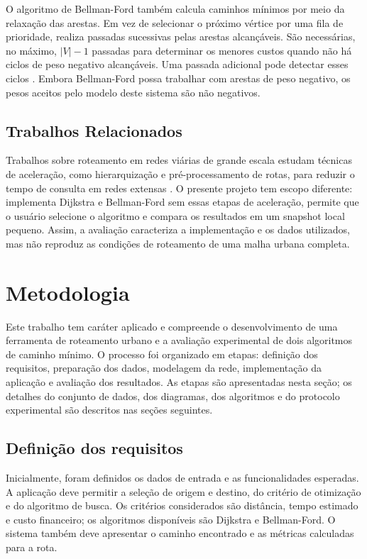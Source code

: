 \documentclass[12pt]{article}
\begin{document}
O algoritmo de Bellman-Ford também calcula caminhos mínimos por meio
da relaxação das arestas. Em vez de selecionar o próximo vértice por
uma fila de prioridade, realiza passadas sucessivas pelas arestas
alcançáveis. São necessárias, no máximo, $|V|-1$ passadas para
determinar os menores custos quando não há ciclos de peso negativo
alcançáveis. Uma passada adicional pode detectar esses ciclos
\cite{sedgewick2011}. Embora Bellman-Ford possa trabalhar com arestas
de peso negativo, os pesos aceitos pelo modelo deste sistema são
não negativos.

\subsection{Trabalhos Relacionados}

Trabalhos sobre roteamento em redes viárias de grande escala estudam
técnicas de aceleração, como hierarquização e pré-processamento de
rotas, para reduzir o tempo de consulta em redes extensas
\cite{bast2016}. O presente projeto tem escopo diferente: implementa
Dijkstra e Bellman-Ford sem essas etapas de aceleração, permite que o
usuário selecione o algoritmo e compara os resultados em um snapshot
local pequeno. Assim, a avaliação caracteriza a implementação e os
dados utilizados, mas não reproduz as condições de roteamento de uma
malha urbana completa.
\section{Metodologia}
\label{sec:metodologia}

Este trabalho tem caráter aplicado e compreende o desenvolvimento de
uma ferramenta de roteamento urbano e a avaliação experimental de dois
algoritmos de caminho mínimo. O processo foi organizado em etapas:
definição dos requisitos, preparação dos dados, modelagem da rede,
implementação da aplicação e avaliação dos resultados. As etapas são
apresentadas nesta seção; os detalhes do conjunto de dados, dos
diagramas, dos algoritmos e do protocolo experimental são descritos nas
seções seguintes.

\subsection{Definição dos requisitos}

Inicialmente, foram definidos os dados de entrada e as funcionalidades
esperadas. A aplicação deve permitir a seleção de origem e destino, do
critério de otimização e do algoritmo de busca. Os critérios
considerados são distância, tempo estimado e custo financeiro; os
algoritmos disponíveis são Dijkstra e Bellman-Ford. O sistema também
deve apresentar o caminho encontrado e as métricas calculadas para a
rota.
\end{document}
